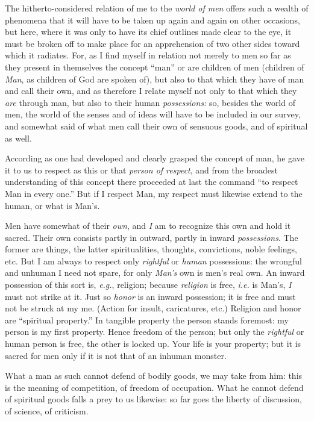 \documentclass[12pt,a4paper]{book}
\begin{document}
The hitherto-considered relation of me to the \textit{world of men} offers 
such a wealth of phenomena that it will have to be taken up again and again on 
other occasions, but here, where it was only to have its chief outlines made 
clear to the eye, it must be broken off to make place for an apprehension of 
two other sides toward which it radiates. For, as I find myself in relation 
not merely to men so far as they present in themselves the concept ``man'' 
or are children of men (children of \textit{Man}, as children of God are 
spoken of), but also to that which they have of man and call their own, and as 
therefore I relate myself not only to that which they \textit{are} through 
man, but also to their human \textit{possessions:} so, besides the world of 
men, the world of the senses and of ideas will have to be included in our 
survey, and somewhat said of what men call their own of sensuous goods, and of 
spiritual as well.

According as one had developed and clearly grasped the concept of man, he gave 
it to us to respect as this or that \textit{person of respect}, and from the 
broadest understanding of this concept there proceeded at last the command 
``to respect Man in every one.'' But if I respect Man, my respect must 
likewise extend to the human, or what is Man's.

Men have somewhat of their \textit{own}, and \textit{I} am to recognize this 
own and hold it sacred. Their own consists partly in outward, partly in inward 
\textit{possessions}. The former are things, the latter spiritualities, 
thoughts, convictions, noble feelings, etc. But I am always to respect only 
\textit{rightful} or \textit{human} possessions: the wrongful and unhuman I 
need not spare, for only \textit{Man's} own is men's real own. An inward 
possession of this sort is, \textit{e.g.}, religion; because 
\textit{religion} is free, \textit{i.e.} is Man's, \textit{I} must not strike 
at it. Just so \textit{honor} is an inward possession; it is free and must not 
be struck at my me. (Action for insult, caricatures, etc.) Religion and honor 
are ``spiritual property.'' In tangible property the person stands foremost: 
my person is my first property. Hence freedom of the person; but only the 
\textit{rightful} or human person is free, the other is locked up. Your life 
is your property; but it is sacred for men only if it is not that of an 
inhuman monster.

What a man as such cannot defend of bodily goods, we may take from him: this 
is the meaning of competition, of freedom of occupation. What he cannot defend 
of spiritual goods falls a prey to us likewise: so far goes the liberty of 
discussion, of science, of criticism.
\end{document}
